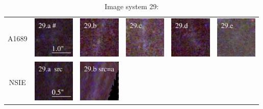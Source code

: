 \documentclass[useAMS,usenatbib]{mn2e}
\begin{document}
\begin{table}
  \caption{Image system 29:}\vspace{0mm}
  \begin{tabular}{cccccc}
    \multicolumn{1}{m{1cm}}{{\Large A1689}}
    & \multicolumn{1}{m{1.7cm}}{\includegraphics[height=2.00cm,clip]{figs/nsie_img/rgb.img_29_a.ps}}
    & \multicolumn{1}{m{1.7cm}}{\includegraphics[height=2.00cm,clip]{figs/nsie_img/rgb.img_29_b.ps}}
    & \multicolumn{1}{m{1.7cm}}{\includegraphics[height=2.00cm,clip]{figs/nsie_img/rgb.img_29_c.ps}}
    & \multicolumn{1}{m{1.7cm}}{\includegraphics[height=2.00cm,clip]{figs/nsie_img/rgb.img_29_d.ps}}
    & \multicolumn{1}{m{1.7cm}}{\includegraphics[height=2.00cm,clip]{figs/nsie_img/rgb.img_29_e.ps}} \\
    \multicolumn{1}{m{1cm}}{{\Large NSIE}}
    & \multicolumn{1}{m{1.7cm}}{\includegraphics[height=2.00cm,clip]{figs/nsie_img/rgb.src_29_a.ps}}
    & \multicolumn{1}{m{1.7cm}}{\includegraphics[height=2.00cm,clip]{figs/nsie_img/rgb.pre_29_b_a_tri.ps}}

\end{tabular}
\end{table}
\end{document}
